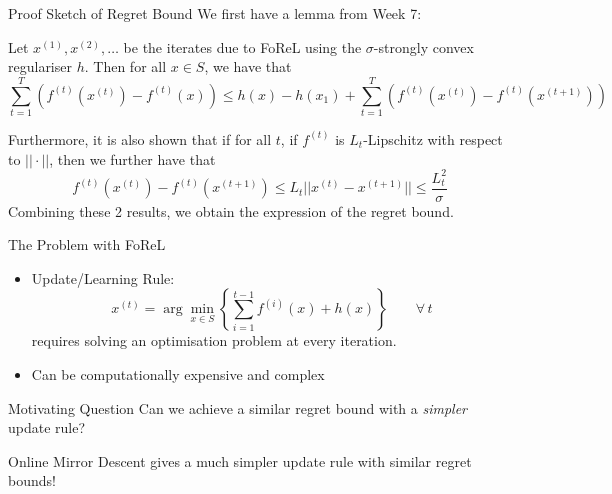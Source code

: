\documentclass{beamer}
\begin{document}
\begin{frame}{Proof Sketch of Regret Bound}
We first have a lemma from Week 7: \begin{lemma}\label{lemma:iterates_forel}
    Let $x^{(1)}, x^{(2)}, \ldots$ be the iterates due to FoReL using the $\sigma$-strongly convex regulariser $h$. Then for all $x \in S$, we have that \begin{equation}\label{eqn:lemma_forel}
        \sum_{t=1}^T (f^{(t)}(x^{(t)}) - f^{(t)}(x)) \leq h(x) - h(x_1) + \sum_{t=1}^T (f^{(t)}(x^{(t)}) - f^{(t)}(x^{(t+1)}))
    \end{equation}
\end{lemma}
Furthermore, it is also shown that if for all $t$, if $f^{(t)}$ is $L_t$-Lipschitz with respect to $||\cdot||$, then we further have that 
\begin{equation}\label{eqn:lemma_forel_lipschitz}
    f^{(t)}(x^{(t)}) - f^{(t)}(x^{(t+1)}) \leq L_t ||x^{(t)} - x^{(t+1)}|| \leq \frac{L_t^2}{\sigma}
\end{equation}
    Combining these 2 results, we obtain the expression of the regret bound.
\end{frame}

\begin{frame}{The Problem with FoReL}
    \begin{itemize}
        \item Update/Learning Rule: $$x^{(t)} = \arg \min_{x \in S} \left\{\sum_{i = 1}^{t-1} f^{(i)}(x) + h(x)\right\}\qquad\forall\,t$$ requires solving an optimisation problem at every iteration.
        \item Can be computationally expensive and complex
    \end{itemize}
    \begin{block}{Motivating Question}
    Can we achieve a similar regret bound with a \textit{simpler} update rule?
    \end{block}
    
    Online Mirror Descent gives a much simpler update rule with similar regret bounds!
\end{frame}
% 
% 
% 
\end{document}

